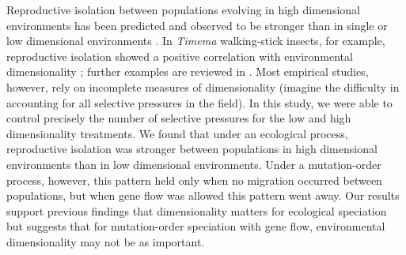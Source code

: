 \begin{doublespace}











%
%
%
%



Reproductive isolation between populations evolving in high dimensional
environments has been predicted and observed to be stronger than in single or
low dimensional environments \citep{ric93,nos09,nos09b}.
%
In \emph{Timema} walking-stick insects, for example, reproductive isolation
showed a positive correlation with environmental dimensionality
\citep{nos08b,nos09b}; further examples are reviewed in \citet{nos09}.
%
Most empirical studies, however, rely on incomplete measures of dimensionality
(imagine the difficulty in accounting for all selective pressures in the field).
%
In this study, we were able to control precisely the number of selective
pressures for the low and high dimensionality treatments.
%
We found that under an ecological process, reproductive isolation was stronger
between populations in high dimensional environments than in low dimensional
environments.
%
Under a mutation-order process, however, this pattern held only when no
migration occurred between populations, but when gene flow was allowed this
pattern went away.
%
Our results support previous findings that dimensionality matters for
ecological speciation but suggests that for mutation-order speciation with gene
flow, environmental dimensionality may not be as important.




\end{doublespace}
